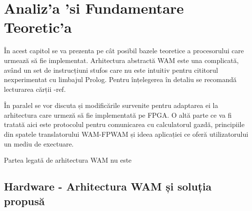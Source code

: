 \documentclass[12pt,a4paper,twoside]{report}
\begin{document}
%
%
%
%
%
%
%
\chapter{Analiz'a 'si Fundamentare Teoretic'a}
În acest capitol se va prezenta pe cât posibil bazele teoretice a procesorului care urmează să fie implementat. Arhitectura abstractă WAM este una complicată, având un set de instrucțiuni stufos care nu este intuitiv pentru cititorul nexperimentat cu limbajul Prolog. Pentru înțelegerea în detaliu se recomandă lecturarea cărții -ref. 

În paralel se vor discuta și modificările survenite pentru adaptarea ei la arhitectura care urmeză să fie implementată pe FPGA. O altă parte ce va fi tratată aici este protocolul pentru comunicarea cu calculatorul gazdă, principiile din spatele translatorului WAM-FPWAM și ideea aplicației ce oferă utilizatorului un mediu de exectuare.

Partea legată de arhitectura WAM nu este
\section{Hardware - Arhitectura WAM și soluția propusă}
\end{document}
